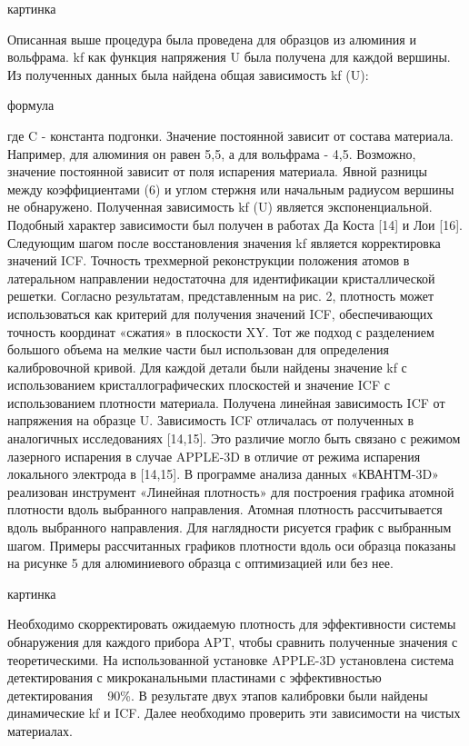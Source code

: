 картинка

Описанная выше процедура была проведена для образцов из алюминия и вольфрама. kf как функция напряжения U была получена для каждой вершины. Из полученных данных была найдена общая зависимость kf (U):

формула

где C - константа подгонки. Значение постоянной зависит от состава материала. Например, для алюминия он равен 5,5, а для вольфрама - 4,5. Возможно, значение постоянной зависит от поля испарения материала. Явной разницы между коэффициентами (6) и углом стержня или начальным радиусом вершины не обнаружено. Полученная зависимость kf (U) является экспоненциальной. Подобный характер зависимости был получен в работах Да Коста [14] и Лои [16].
Следующим шагом после восстановления значения kf является корректировка значений ICF. Точность трехмерной реконструкции положения атомов в латеральном направлении недостаточна для идентификации кристаллической решетки. Согласно результатам, представленным на рис. 2, плотность может использоваться как критерий для получения значений ICF, обеспечивающих точность координат «сжатия» в плоскости XY. Тот же подход с разделением большого объема на мелкие части был использован для определения калибровочной кривой. Для каждой детали были найдены значение kf с использованием кристаллографических плоскостей и значение ICF с использованием плотности материала. Получена линейная зависимость ICF от напряжения на образце U. Зависимость ICF отличалась от полученных в аналогичных исследованиях [14,15]. Это различие могло быть связано с режимом лазерного испарения в случае APPLE-3D в отличие от режима испарения локального электрода в [14,15].
В программе анализа данных «КВАНТМ-3D» реализован инструмент «Линейная плотность» для построения графика атомной плотности вдоль выбранного направления. Атомная плотность рассчитывается вдоль выбранного направления. Для наглядности рисуется график с выбранным шагом. Примеры рассчитанных графиков плотности вдоль оси образца показаны на рисунке 5 для алюминиевого образца с оптимизацией или без нее.

картинка

Необходимо скорректировать ожидаемую плотность для эффективности системы обнаружения для каждого прибора APT, чтобы сравнить полученные значения с теоретическими. На использованной установке APPLE-3D установлена система детектирования с микроканальными пластинами с эффективностью детектирования ~ 90\%. В результате двух этапов калибровки были найдены динамические kf и ICF. Далее необходимо проверить эти зависимости на чистых материалах.

